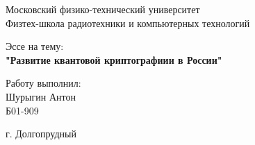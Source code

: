 
\begin{titlepage}
	\begin{center}
		\large 	Московский физико-технический университет \\
		Физтех-школа радиотехники и компьютерных технологий\\
		\vspace{0.2cm}
		
		\vspace{4.5cm}
		Эссе на тему:  \\ \vspace{0.2cm}
		\LARGE \textbf{"Развитие квантовой криптографиии в России"}
	\end{center}
	\vspace{2.3cm} \large
	
	\begin{center}
		Работу выполнил: \\
		Шурыгин Антон \\
		Б01-909

	\end{center}
	
	\begin{center} \vspace{60mm}
		г. Долгопрудный \\
	\end{center}
\end{titlepage}


\newpage
\thispagestyle{plain}
\tableofcontents
\thispagestyle{plain}
\newpage